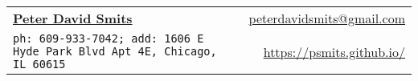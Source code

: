 \documentclass[letterpaper,11pt]{article}
\newcommand{\resheading}[1]{{\large \colorbox{mygrey}{\begin{minipage}{\textwidth}{\textbf{#1 \vphantom{p\^{E}}}}\end{minipage}}}}
\begin{document}
\newcommand{\mywebheader}{
\begin{tabular*}{7in}{l@{\extracolsep{\fill}}r}
	\textbf{\href{https://psmits.github.io/}{\LARGE Peter David Smits}} & \href{mailto:peterdavidsmits@gmail.com}{peterdavidsmits@gmail.com}\\
    {\footnotesize \texttt{ph: 609-933-7042; add: 1606 E Hyde Park Blvd Apt 4E, Chicago, IL 60615 }} & \href{https://psmits.github.io/}{https://psmits.github.io/} \\
	\end{tabular*}
\\
\vspace{0.1in}}

\mywebheader

\end{document}
